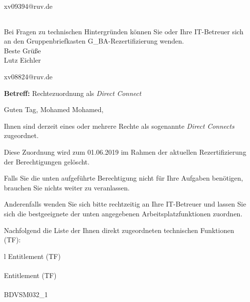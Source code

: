 \documentclass[a4paper,landscape,12pt]{letter}
\begin{document}
\begin{letter}{xv09394@ruv.de\hfill \break}
\begin{tiny}
\begin{longtable}{|p{35mm}|p{15mm}|p{25mm}|p{10mm}|p{40mm}|p{50mm}|p{50mm}|}
\hline
		\end{longtable}
		\end{tiny}
	
\begin{minipage}{\textwidth}
			Bei Fragen zu technischen Hintergründen können Sie 
			oder Ihre IT-Betreuer sich an den Gruppenbriefkasten 
			G\_BA-Rezertifizierung
			wenden.\\
			\linebreak
			Beste Grüße\\
			Lutz Eichler
	\end{minipage}
	\end{letter}
	
\begin{letter}{xv08824@ruv.de\hfill \break}
\begin{normalsize}
	\opening{\textbf{Betreff:} Rechtezuordnung als \emph{Direct Connect}}
	\begin{normalsize} \hfill
	\end{normalsize}

	\begin{normalsize}
		Guten Tag, 
	Mohamed Mohamed, \hfill \break
	\end{normalsize}
	\end{normalsize}
	
\begin{normalsize}
	Ihnen sind derzeit eines oder mehrere Rechte als sogenannte \emph{Direct Connects} zugeordnet.
	
	Diese Zuordnung wird zum 01.06.2019 im Rahmen der aktuellen Rezertifizierung der Berechtigungen gelöscht.
	
	Falls Sie die unten aufgeführte Berechtigung nicht für Ihre Aufgaben benötigen, 
	brauchen Sie nichts weiter zu veranlassen.
	
	Anderenfalls wenden Sie sich bitte rechtzeitig an Ihre IT-Betreuer 
	und lassen Sie sich die bestgeeignete der unten angegebenen Arbeitsplatzfunktionen zuordnen.
	\end{normalsize}
	
\begin{normalsize}
	Nachfolgend die Liste der Ihnen direkt zugeordneten technischen Funktionen (TF):

	\begin{longtable}{l}
		Entitlement (TF) \\ \hline
		\endfirsthead
		\\\hline
		Entitlement (TF) \\ \hline
		\endhead %
		\multicolumn{1}{r@{}}{Fortsetzung \ldots}\\
		\endfoot
		\hline
		\endlastfoot
	BDVSM032\_1\\
	\end{longtable}
	\end{normalsize}
	

\end{letter}
\end{document}
